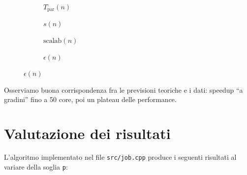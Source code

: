 \documentclass[12pt]{article}
\begin{document}
    \begin{figure}[H]
      \centering
      \begin{subfigure}[b]{0.45\textwidth}
        \centering
        \resizebox{1.1\textwidth}{!}{}
        \caption*{\(T_{\text{par}}(n)\)}
      \end{subfigure}
      \hspace{0.05\textwidth}
      \begin{subfigure}[b]{0.45\textwidth}
        \centering
        \resizebox{1.1\textwidth}{!}{}
        \caption*{\(s(n)\)}
      \end{subfigure}

      \vspace{0.05\textwidth}

      \begin{subfigure}[b]{0.45\textwidth}
        \centering
        \resizebox{1.1\textwidth}{!}{}
        \caption*{\(\text{scalab}(n)\)}
      \end{subfigure}
      \hspace{0.05\textwidth}
      \begin{subfigure}[b]{0.45\textwidth}
        \centering
        \resizebox{1.1\textwidth}{!}{}
        \caption*{\(\epsilon(n)\)}
      \end{subfigure}
    \end{figure}

    Osserviamo buona corrispondenza fra le previsioni teoriche e i dati:
    speedup ``a gradini'' fino a 50 core, poi un plateau delle performance.

    \section{Valutazione dei risultati}

    L'algoritmo implementato nel file \texttt{src/job.cpp} produce i
    seguenti risultati al variare della soglia \texttt{p}:
\end{document}
